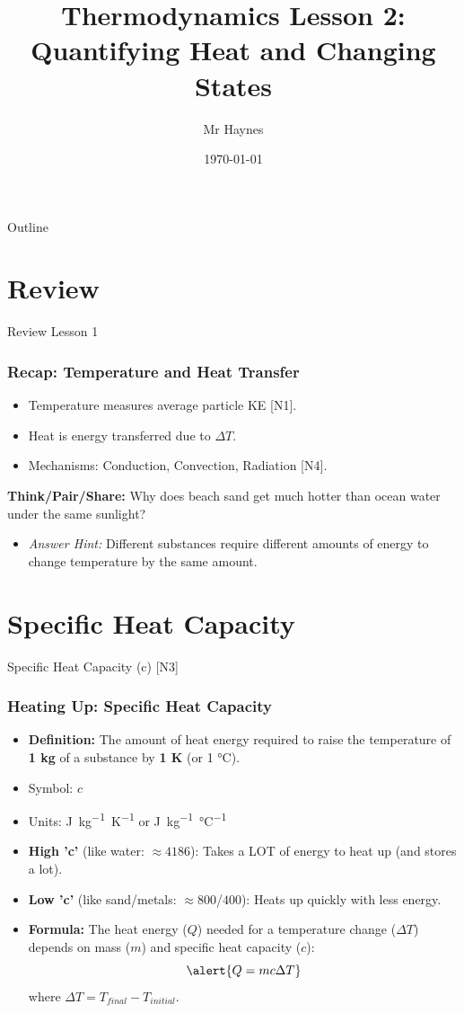 \documentclass[xcolor=svgnames]{beamer}
\title[Thermo: Quantifying Heat]{Thermodynamics Lesson 2: Quantifying Heat and Changing States}
\author[P. Haynes]{Mr Haynes}
\institute[GHS]{Gosford High School}
\date{\today}
\begin{document}
\begin{frame}
    \titlepage
\end{frame}

\begin{frame}{Outline}
    \tableofcontents
\end{frame}

\section{Review}
\begin{frame}{Review Lesson 1}
    \frametitle{Recap: Temperature and Heat Transfer}
    \begin{itemize}
        \item Temperature measures average particle KE [N1].
        \item Heat is energy transferred due to $\Delta T$.
        \item Mechanisms: Conduction, Convection, Radiation [N4].
    \end{itemize}
    \vspace{1em}
    \textbf{Think/Pair/Share:} Why does beach sand get much hotter than ocean water under the same sunlight?
    \pause
    \begin{itemize}
        \item \textit{Answer Hint:} Different substances require different amounts of energy to change temperature by the same amount.
    \end{itemize}
\end{frame}

\section{Specific Heat Capacity}
\begin{frame}{Specific Heat Capacity (c) [N3]}
    \frametitle{Heating Up: Specific Heat Capacity}
    \begin{itemize}
        \item \textbf{Definition:} The amount of heat energy required to raise the temperature of \textbf{1 kg} of a substance by \textbf{1 K} (or 1 °C).
        \item Symbol: $c$
        \item Units: \si{J.kg^{-1}.K^{-1}} or \si{J.kg^{-1}.\celsius^{-1}}
        \item \textbf{High 'c'} (like water: $\approx 4186$): Takes a LOT of energy to heat up (and stores a lot).
        \item \textbf{Low 'c'} (like sand/metals: $\approx 800$/$400$): Heats up quickly with less energy.
        \item \textbf{Formula:} The heat energy ($Q$) needed for a temperature change ($\Delta T$) depends on mass ($m$) and specific heat capacity ($c$):
        \begin{equation*}
        \alert{Q = mc\Delta T}
        \end{equation*}
        where $\Delta T = T_{final} - T_{initial}$.
    \end{itemize}
\end{frame}
\end{document}
